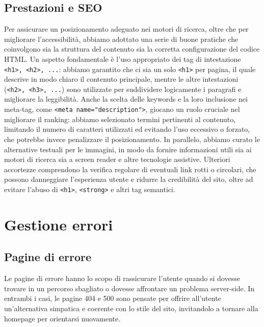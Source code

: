 \documentclass{article}
\begin{document}
\subsection{Prestazioni e SEO}
Per assicurare un posizionamento adeguato nei motori di ricerca, oltre che per migliorare l'accessibi\-lità, abbiamo adottato una serie di buone pratiche che coinvolgono sia la struttura del contenuto sia la corretta configurazione del codice HTML.
Un aspetto fondamentale è l'uso appropriato dei tag di intestazione \verb|<h1>, <h2>, ...|: abbiamo garantito che ci sia un solo \verb|<h1>| per pagina, il quale descrive in modo chiaro il contenuto principale, mentre le altre intestazioni (\verb|<h2>, <h3>, ...|) sono utilizzate per suddividere logicamente i paragrafi e migliorare la leggibilità. Anche la scelta delle keywords e la loro inclusione nei meta-tag, come \verb|<meta name="description">|, giocano un ruolo cruciale nel migliorare il ranking: abbiamo selezionato termini pertinenti al contenuto, limitando il numero di caratteri utilizzati ed evitando l'uso eccessivo o forzato, che potrebbe invece penalizzare il posizionamento. In parallelo, abbiamo curato le alternative testuali per le immagini, in modo da fornire informazioni utili sia ai motori di ricerca sia a screen reader e altre tecnologie assistive. Ulteriori accortezze comprendono la verifica regolare di eventuali link rotti o circolari, che possono danneggiare l'esperienza utente e ridurre la credibilità del sito, oltre ad evitare l'abuso di \verb|<h1>|, \verb|<strong>| e altri tag semantici.
\section{Gestione errori}
\subsection{Pagine di errore}
Le pagine di errore hanno lo scopo di rassicurare l'utente quando si dovesse trovare in un percorso sbagliato o dovesse affrontare un problema server-side. In entrambi i casi, le pagine 404 e 500 sono pensate per offrire all'utente un'alternativa simpatica e coerente con lo stile del sito, invitandolo a tornare alla homepage per orientarsi nuovamente.
\end{document}
